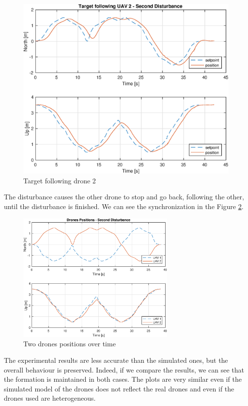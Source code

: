 \begin{figure}
\centering
\includegraphics[width=0.7\linewidth]{chapters/chapter-05/figures/following_2_2.eps}
\caption{Target following drone 2}
\label{fig:exp_following_2_2}
\end{figure}

The disturbance causes the other drone to stop and go back, following the other,
until the disturbance is finished.
We can see the synchronization in the Figure \ref{fig:exp_overlapped_2}.

\begin{figure}
\centering
\includegraphics[width=0.7\textwidth]{chapters/chapter-05/figures/overlapped_2.eps}
\caption{Two drones positions over time}
\label{fig:exp_overlapped_2}
\end{figure}

The experimental results are less accurate than the simulated ones,
but the overall behaviour is preserved. Indeed, if we compare the results, we
can see that the formation is maintained in both cases. The plots are very similar
even if the simulated model of the drones does not reflect the real drones and even if
the drones used are heterogeneous.
